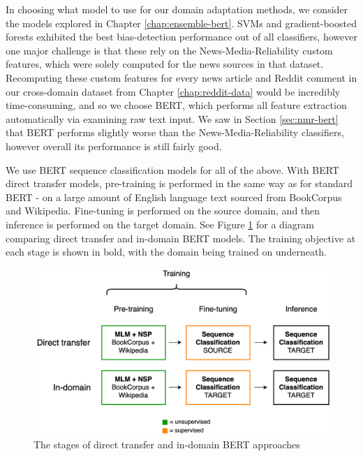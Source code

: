 In choosing what model to use for our domain adaptation methods, we consider the models explored in Chapter \ref{chap:ensemble-bert}. SVMs and gradient-boosted forests exhibited the best bias-detection performance out of all classifiers, however one major challenge is that these rely on the News-Media-Reliability custom features, which were solely computed for the news sources in that dataset. Recomputing these custom features for every news article and Reddit comment in our cross-domain dataset from Chapter \ref{chap:reddit-data} would be incredibly time-consuming, and so we choose BERT, which performs all feature extraction automatically via examining raw text input. We saw in Section \ref{sec:nmr-bert} that BERT performs slightly worse than the News-Media-Reliability classifiers, however overall its performance is still fairly good.

We use BERT sequence classification models for all of the above. With BERT direct transfer models, pre-training is performed in the same way as for standard BERT - on a large amount of English language text sourced from BookCorpus and Wikipedia. Fine-tuning is performed on the source domain, and then inference is performed on the target domain. See Figure \ref{fig:direct-transfer-in-domain-bert} for a diagram comparing direct transfer and in-domain BERT models. The training objective at each stage is shown in bold, with the domain being trained on underneath.

\begin{figure}
    \centering
    \hspace{-1.5cm}
    \includegraphics[scale=0.3]{0-img/direct-transfer-in-domain-bert.png}
    \caption{The stages of direct transfer and in-domain BERT approaches}
    \label{fig:direct-transfer-in-domain-bert}
\end{figure}

